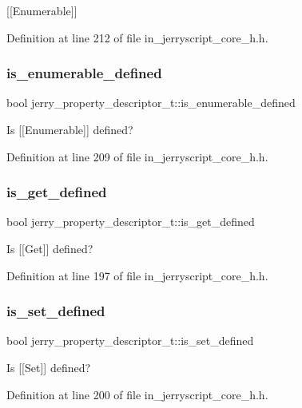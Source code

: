 [[Enumerable]] 

Definition at line 212 of file in\+\_\+jerryscript\+\_\+core\+\_\+h.\+h.

\mbox{\label{structjerry__property__descriptor__t_a403abf4ead95eb4fe2a3a9c14e705590}} 
\subsubsection{is\_enumerable\_defined}
{\footnotesize\ttfamily bool jerry\+\_\+property\+\_\+descriptor\+\_\+t\+::is\+\_\+enumerable\+\_\+defined}

Is [[Enumerable]] defined? 

Definition at line 209 of file in\+\_\+jerryscript\+\_\+core\+\_\+h.\+h.

\mbox{\label{structjerry__property__descriptor__t_a1fe41ba0fbfd3acc2765c309a0a9799e}} 
\subsubsection{is\_get\_defined}
{\footnotesize\ttfamily bool jerry\+\_\+property\+\_\+descriptor\+\_\+t\+::is\+\_\+get\+\_\+defined}

Is [[Get]] defined? 

Definition at line 197 of file in\+\_\+jerryscript\+\_\+core\+\_\+h.\+h.

\mbox{\label{structjerry__property__descriptor__t_a23265aa6856bf258380c1b938b00705f}} 
\subsubsection{is\_set\_defined}
{\footnotesize\ttfamily bool jerry\+\_\+property\+\_\+descriptor\+\_\+t\+::is\+\_\+set\+\_\+defined}

Is [[Set]] defined? 

Definition at line 200 of file in\+\_\+jerryscript\+\_\+core\+\_\+h.\+h.

